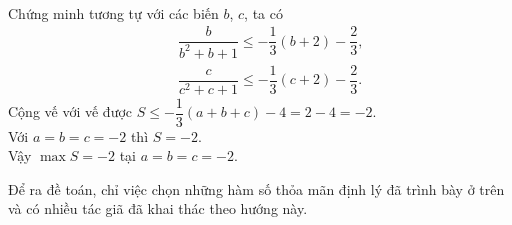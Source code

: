 {\begin{vd}
{\begin{eqnarray*}
		\end{eqnarray*}
		Chứng minh tương tự với các biến $b$, $c$, ta có
		\begin{eqnarray*}
			&& \dfrac{b}{b^2+b+1}\le -\dfrac{1}{3}(b+2)-\dfrac{2}{3},\\
			&& \dfrac{c}{c^2+c+1}\le -\dfrac{1}{3}(c+2)-\dfrac{2}{3}.
		\end{eqnarray*}
		Cộng vế với vế được $S \le -\dfrac{1}{3}(a+b+c)-4=2-4=-2.$\\
		Với $a=b=c=-2$ thì $S=-2.$\\
		Vậy $\max S=-2$ tại $a=b=c=-2$.
	}
\end{vd}
\begin{nx}
	Để ra đề toán, chỉ việc chọn những hàm số thỏa mãn định lý đã trình bày ở trên và có nhiều tác giã đã khai thác theo hướng này.
\end{nx}
}
